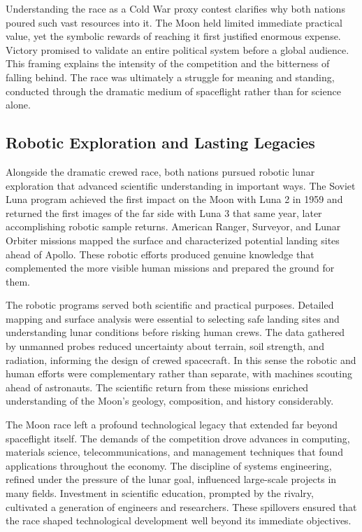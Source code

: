 Understanding the race as a Cold War proxy contest clarifies why both nations poured such vast resources into it. The Moon held limited immediate practical value, yet the symbolic rewards of reaching it first justified enormous expense. Victory promised to validate an entire political system before a global audience. This framing explains the intensity of the competition and the bitterness of falling behind. The race was ultimately a struggle for meaning and standing, conducted through the dramatic medium of spaceflight rather than for science alone. \cite{mcdougall1985} \cite{cadbury2006}

\subsection{Robotic Exploration and Lasting Legacies}
Alongside the dramatic crewed race, both nations pursued robotic lunar exploration that advanced scientific understanding in important ways. The Soviet Luna program achieved the first impact on the Moon with Luna 2 in 1959 and returned the first images of the far side with Luna 3 that same year, later accomplishing robotic sample returns. American Ranger, Surveyor, and Lunar Orbiter missions mapped the surface and characterized potential landing sites ahead of Apollo. These robotic efforts produced genuine knowledge that complemented the more visible human missions and prepared the ground for them.

The robotic programs served both scientific and practical purposes. Detailed mapping and surface analysis were essential to selecting safe landing sites and understanding lunar conditions before risking human crews. The data gathered by unmanned probes reduced uncertainty about terrain, soil strength, and radiation, informing the design of crewed spacecraft. In this sense the robotic and human efforts were complementary rather than separate, with machines scouting ahead of astronauts. The scientific return from these missions enriched understanding of the Moon's geology, composition, and history considerably.

The Moon race left a profound technological legacy that extended far beyond spaceflight itself. The demands of the competition drove advances in computing, materials science, telecommunications, and management techniques that found applications throughout the economy. The discipline of systems engineering, refined under the pressure of the lunar goal, influenced large-scale projects in many fields. Investment in scientific education, prompted by the rivalry, cultivated a generation of engineers and researchers. These spillovers ensured that the race shaped technological development well beyond its immediate objectives.

